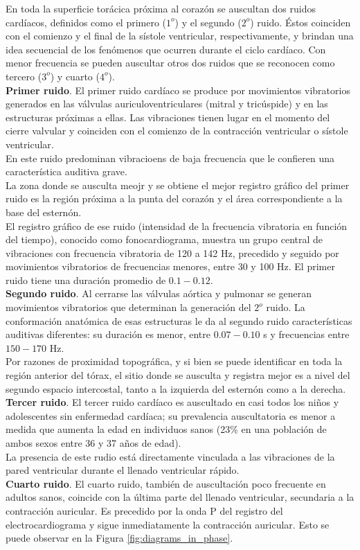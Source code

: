 En toda la superficie torácica próxima al corazón se auscultan dos ruidos cardíacos, definidos como el primero
($1^o$) y el segundo ($2^o$) ruido. Éstos coinciden con el comienzo y el final de la sístole ventricular,
respectivamente, y brindan una idea secuencial de los fenómenos que ocurren durante el ciclo cardíaco. Con menor
frecuencia se pueden auscultar otros dos ruidos que se reconocen como tercero ($3^o$) y cuarto ($4^o$). \\
\indent \textbf{Primer ruido}. El primer ruido cardíaco se produce por movimientos vibratorios generados en las
válvulas auriculoventriculares (mitral y tricúspide) y en las estructuras próximas a ellas. Las vibraciones tienen
lugar en el momento del cierre valvular y coinciden con el comienzo de la contracción ventricular o sístole
ventricular. \\
\indent En este ruido predominan vibracioens de baja frecuencia que le confieren una característica auditiva
grave. \\
\indent La zona donde se ausculta meojr y se obtiene el mejor registro gráfico del primer ruido es la región
próxima a la punta del corazón y el área correspondiente a la base del esternón. \\
\indent El registro gráfico de ese ruido (intensidad de la frecuencia vibratoria en función del tiempo),
conocido como fonocardiograma, muestra un grupo central de vibraciones con frecuencia vibratoria de 120 a 142 Hz,
precedido y seguido por movimientos vibratorios de frecuencias menores, entre 30 y 100 Hz. El primer ruido tiene una
duración promedio de $0.1-0.12$. \\
\indent \textbf{Segundo ruido}. Al cerrarse las válvulas aórtica y pulmonar se generan movimientos vibratorios
que determinan la generación del $2^o$ ruido. La conformación anatómica de esas estructuras le da al segundo ruido
características auditivas diferentes: su duración es menor, entre $0.07-0.10$ s y frecuencias entre $150-170$ Hz. \\
\indent Por razones de proximidad topográfica, y si bien se puede identificar en toda la región anterior del
tórax, el sitio donde se ausculta y registra mejor es a nivel del segundo espacio intercostal, tanto a la izquierda
del esternón como a la derecha.
\indent \textbf{Tercer ruido}. El tercer ruido cardíaco es auscultado en casi todos los niños y adolescentes sin
enfermedad cardíaca; su prevalencia auscultatoria es menor a medida que aumenta la edad en individuos sanos (23\% en
una población de ambos sexos entre 36 y 37 años de edad). \\
\indent La presencia de este rudio está directamente vinculada a las vibraciones de la pared ventricular durante
el llenado ventricular rápido. \\
\indent \textbf{Cuarto ruido}. El cuarto ruido, también de auscultación poco frecuente en adultos sanos,
coincide con la última parte del llenado ventricular, secundaria a la contracción auricular. Es precedido por la
onda P del registro del electrocardiograma y sigue inmediatamente la contracción auricular. Esto se puede observar
en la Figura \ref{fig:diagrams_in_phase}.

